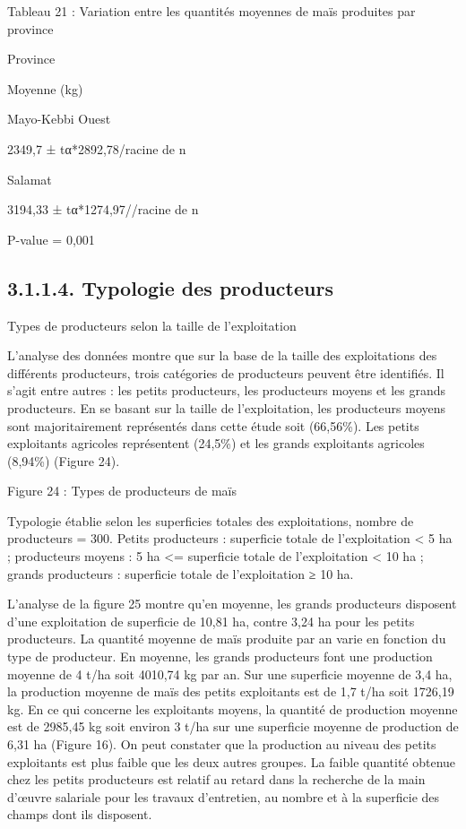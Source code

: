 \documentclass[12pt,oneside]{report}
\begin{document}
Tableau 21 : Variation entre les quantités moyennes de maïs produites par province

Province

Moyenne (kg)

Mayo-Kebbi Ouest

2349,7 ± tα*2892,78/racine de n

Salamat

3194,33 ± tα*1274,97//racine de n

P-value = 0,001

\subsection{3.1.1.4. Typologie des producteurs}
Types de producteurs selon la taille de l’exploitation

L’analyse des données montre que sur la base de la taille des exploitations des différents producteurs, trois catégories de producteurs peuvent être identifiés. Il s’agit entre autres : les petits producteurs, les producteurs moyens et les grands producteurs. En se basant sur la taille de l’exploitation, les producteurs moyens sont majoritairement représentés dans cette étude soit (66,56\%). Les petits exploitants agricoles représentent (24,5\%) et les grands exploitants agricoles (8,94\%) (Figure 24).

Figure 24 : Types de producteurs de maïs

Typologie établie selon les superficies totales des exploitations, nombre de producteurs = 300. Petits producteurs : superficie totale de l’exploitation < 5 ha ; producteurs moyens : 5 ha <= superficie totale de l’exploitation < 10 ha ; grands producteurs : superficie totale de l’exploitation ≥ 10 ha.

L’analyse de la figure 25 montre qu’en moyenne, les grands producteurs disposent d’une exploitation de superficie de 10,81 ha, contre 3,24 ha pour les petits producteurs. La quantité moyenne de maïs produite par an varie en fonction du type de producteur. En moyenne, les grands producteurs font une production moyenne de 4 t/ha soit 4010,74 kg par an. Sur une superficie moyenne de 3,4 ha, la production moyenne de maïs des petits exploitants est de 1,7 t/ha soit 1726,19 kg. En ce qui concerne les exploitants moyens, la quantité de production moyenne est de 2985,45 kg soit environ 3 t/ha sur une superficie moyenne de production de 6,31 ha (Figure 16). On peut constater que la production au niveau des petits exploitants est plus faible que les deux autres groupes. La faible quantité obtenue chez les petits producteurs est relatif au retard dans la recherche de la main d’œuvre salariale pour les travaux d’entretien, au nombre et à la superficie des champs dont ils disposent.
\end{document}
